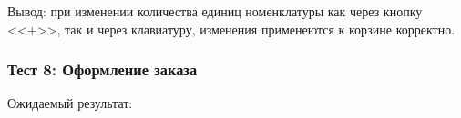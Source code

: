     
    

    
    


Вывод: при изменении количества единиц номенклатуры как через кнопку <<+>>, так и через клавиатуру, изменения применеются к корзине корректно.

\subsubsection*{Тест 8: Оформление заказа}

Ожидаемый результат:

